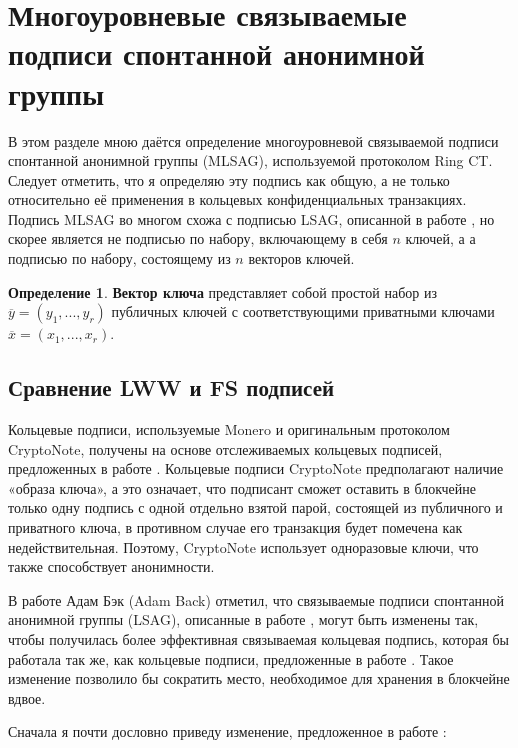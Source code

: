 \documentclass{mrl}
\theoremstyle{definition}
\numberwithin{thm}{section}
\newtheorem{defn}[thm]{Определение}
\begin{document}
\section{Многоуровневые связываемые подписи спонтанной анонимной группы}\label{MLSAGsection}

В этом разделе мною даётся определение многоуровневой связываемой подписи спонтанной анонимной группы (MLSAG), используемой протоколом Ring CT. Следует отметить, что я определяю эту подпись как общую, а не только относительно её применения в кольцевых конфиденциальных транзакциях. Подпись MLSAG во многом схожа с подписью LSAG, описанной в работе \cite{LWW}, но скорее является не подписью по набору, включающему в себя $n$ ключей, а а подписью по набору, состоящему из $n$ векторов ключей.

\begin{defn}
\label{defn:A-key-vector-is} \textbf{Вектор ключа} представляет собой простой набор из $\overline{y}=\left(y_{1},...,y_{r}\right)$ публичных ключей с соответствующими приватными ключами $\overline{x}=\left(x_{1},...,x_{r}\right)$.
\end{defn}

\subsection{\label{sub:BackLSAG}Сравнение LWW и FS подписей}

Кольцевые подписи, используемые Monero и оригинальным протоколом CryptoNote, получены на основе отслеживаемых кольцевых подписей, предложенных в работе \cite{FS}. Кольцевые подписи CryptoNote \cite{CN} предполагают наличие «образа ключа», а это означает, что подписант сможет оставить в блокчейне только одну подпись с одной отдельно взятой парой, состоящей из публичного и приватного ключа, в противном случае его транзакция будет помечена как недействительная. Поэтому, CryptoNote использует одноразовые ключи, что также способствует анонимности.

В работе \cite{B} Адам Бэк (Adam Back) отметил, что связываемые подписи спонтанной анонимной группы (LSAG), описанные в работе \cite{LWW}, могут быть изменены так, чтобы получилась более эффективная связываемая кольцевая подпись, которая бы работала так же, как кольцевые подписи, предложенные в работе \cite{FS}. Такое изменение позволило бы сократить место, необходимое для хранения в блокчейне вдвое.

Сначала я почти дословно приведу изменение, предложенное в работе \cite{B}:
\end{document}
